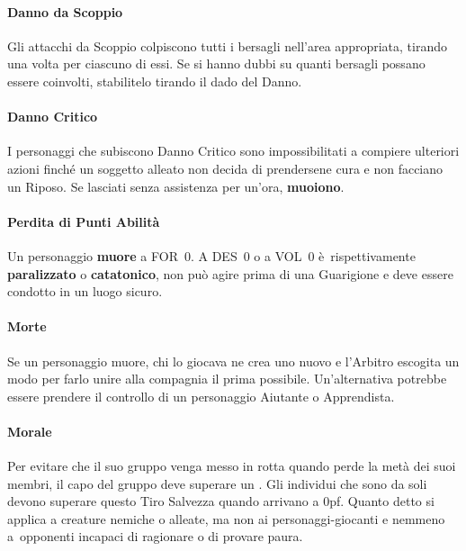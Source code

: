 \documentclass[itdr]{subfiles}
\begin{document}
\vfill
\paragraph{Danno da Scoppio}
Gli attacchi da Scoppio colpiscono tutti i bersagli \mbox{nell’area} appropriata, tirando una volta per ciascuno di essi. Se si hanno dubbi su quanti bersagli possano essere coinvolti, stabilitelo tirando il dado del Danno.

\vfill
\paragraph{Danno Critico}
I personaggi che subiscono Danno Critico sono impossibilitati a compiere ulteriori azioni finché un soggetto alleato non decida di prendersene cura e non facciano un Riposo. Se lasciati senza assistenza per un’ora, \textbf{muoiono}.

\vfill
\paragraph{Perdita di Punti Abilità}
Un personaggio \textbf{muore} a FOR~0. A DES~0 o a VOL~0 è~\mbox{rispettivamente} \textbf{paralizzato} o \textbf{catatonico}, non può \mbox{agire} prima di una Guarigione e deve essere condotto in un luogo sicuro.

\vfill
\paragraph{Morte}
Se un personaggio muore, chi lo giocava ne crea uno nuovo e l’Arbitro escogita un modo per farlo unire alla compagnia il prima possibile. Un'alternativa potrebbe essere prendere il controllo di un personaggio Aiutante o Apprendista.

\vfill
\paragraph{Morale}
Per evitare che il suo gruppo venga messo in rotta quando perde la metà dei suoi membri, il capo del gruppo deve superare un . Gli individui che sono da soli devono superare questo Tiro Salvezza quando arrivano a 0pf. Quanto detto si applica a creature nemiche o alleate, ma non ai personaggi-giocanti e nemmeno a~opponenti incapaci di ragionare o di provare paura.
\end{document}
